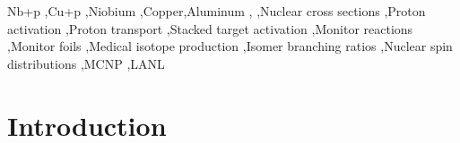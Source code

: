 \documentclass[3p]{elsarticle}
\newcommand{\comment}[1]{\todo[color=blue!20!white,inline]{ASV: #1}}
\begin{document}
\begin{frontmatter}
\begin{abstract}
\end{abstract}

\begin{keyword}
Nb+p \sep Cu+p \sep Niobium \sep Copper\sep Aluminum \sep {}  \sep Nuclear cross sections \sep Proton activation \sep Proton transport \sep Stacked target activation \sep Monitor reactions \sep Monitor foils \sep Medical isotope production \sep Isomer branching ratios \sep Nuclear spin distributions  \sep MCNP \sep  LANL


\end{keyword}

\end{frontmatter}

\listoftodos


\linenumbers



\section{Introduction} \label{sec:intro}

\end{document}
